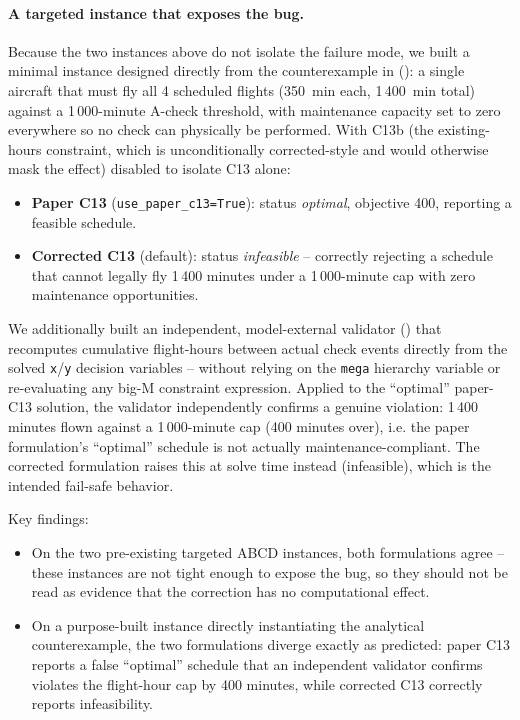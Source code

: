\paragraph{A targeted instance that exposes the bug.}
Because the two instances above do not isolate the failure mode, we built a
minimal instance designed directly from the counterexample in
 ():
a single aircraft that must fly all 4 scheduled flights (350~min each, 1\,400~min
total) against a 1\,000-minute A-check threshold, with maintenance capacity set
to zero everywhere so no check can physically be performed. With C13b (the
existing-hours constraint, which is unconditionally corrected-style and would
otherwise mask the effect) disabled to isolate C13 alone:
\begin{itemize}
  \item \textbf{Paper C13} (\texttt{use\_paper\_c13=True}): status
    \emph{optimal}, objective 400, reporting a feasible schedule.
  \item \textbf{Corrected C13} (default): status \emph{infeasible} --
    correctly rejecting a schedule that cannot legally fly 1\,400 minutes
    under a 1\,000-minute cap with zero maintenance opportunities.
\end{itemize}
We additionally built an independent, model-external validator
() that recomputes cumulative
flight-hours between actual check events directly from the solved
\texttt{x}/\texttt{y} decision variables -- without relying on the \texttt{mega}
hierarchy variable or re-evaluating any big-M constraint expression. Applied
to the ``optimal'' paper-C13 solution, the validator independently confirms a
genuine violation: 1\,400 minutes flown against a 1\,000-minute cap (400
minutes over), i.e. the paper formulation's ``optimal'' schedule is not
actually maintenance-compliant. The corrected formulation raises this at
solve time instead (infeasible), which is the intended fail-safe behavior.

Key findings:
\begin{itemize}
  \item On the two pre-existing targeted ABCD instances, both formulations
    agree -- these instances are not tight enough to expose the bug, so they
    should not be read as evidence that the correction has no computational
    effect.
  \item On a purpose-built instance directly instantiating the analytical
    counterexample, the two formulations diverge exactly as predicted: paper
    C13 reports a false ``optimal'' schedule that an independent validator
    confirms violates the flight-hour cap by 400 minutes, while corrected
    C13 correctly reports infeasibility.
\end{itemize}


